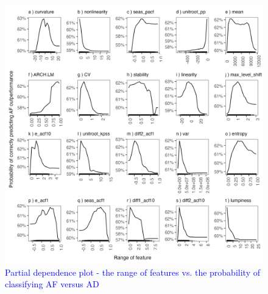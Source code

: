 \documentclass[preprint, 3p,
authoryear]{elsarticle} %
\begin{document}
\begin{figure}[H]

{\centering \includegraphics[width=1\linewidth]{img/partial_dependence1} 

}

\caption{ \textcolor{blue}{Partial dependence plot - the range of features vs. the probability of classifying AF versus AD} }\label{fig:pdpcommon1}
\end{figure}
\end{document}
